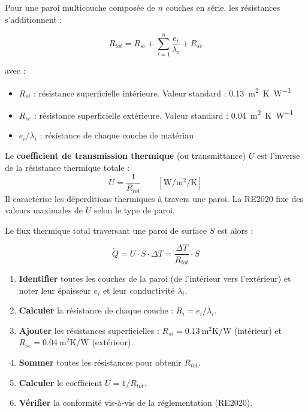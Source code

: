 Pour une paroi multicouche composée de \(n\) couches en série, les résistances s'additionnent :

\begin{equation}
  R_{tot} = R_{si} + \sum_{i=1}^{n} \frac{e_i}{\lambda_i} + R_{se}
  \label{eq:resistance_totale}
\end{equation}

avec :
\begin{itemize}
  \item \(R_{si}\) : résistance superficielle intérieure. Valeur standard : \SI{0,13}{\meter\squared\kelvin\per\watt}
  \item \(R_{se}\) : résistance superficielle extérieure. Valeur standard : \SI{0,04}{\meter\squared\kelvin\per\watt}
  \item \(e_i / \lambda_i\) : résistance de chaque couche de matériau
\end{itemize}

\begin{definition}
  Le \textbf{coefficient de transmission thermique} (ou transmittance) \(U\) est l'inverse
  de la résistance thermique totale :
  \begin{equation}
    U = \frac{1}{R_{tot}}
    \qquad \left[\si{\watt\per\meter\squared\per\kelvin}\right]
    \label{eq:coefficient_U}
  \end{equation}
  Il caractérise les déperditions thermiques à travers une paroi. La RE2020 fixe des valeurs
  maximales de \(U\) selon le type de paroi.
\end{definition}

Le flux thermique total traversant une paroi de surface \(S\) est alors :

\begin{equation}
  \dot{Q} = U \cdot S \cdot \Delta T = \frac{\Delta T}{R_{tot}} \cdot S
  \label{eq:flux_total}
\end{equation}

\begin{methode}[title=Calcul de la résistance thermique d'une paroi multicouche]
  \begin{enumerate}
    \item \textbf{Identifier} toutes les couches de la paroi (de l'intérieur vers
          l'extérieur) et noter leur épaisseur \(e_i\) et leur conductivité \(\lambda_i\).
    \item \textbf{Calculer} la résistance de chaque couche :
          \(R_i = e_i / \lambda_i\).
    \item \textbf{Ajouter} les résistances superficielles :
          \(R_{si} = \SI{0,13}{\meter\squared\kelvin\per\watt}\) (intérieur) et
          \(R_{se} = \SI{0,04}{\meter\squared\kelvin\per\watt}\) (extérieur).
    \item \textbf{Sommer} toutes les résistances pour obtenir \(R_{tot}\).
    \item \textbf{Calculer} le coefficient \(U = 1/R_{tot}\).
    \item \textbf{Vérifier} la conformité vis-à-vis de la réglementation (RE2020).
  \end{enumerate}
\end{methode}

